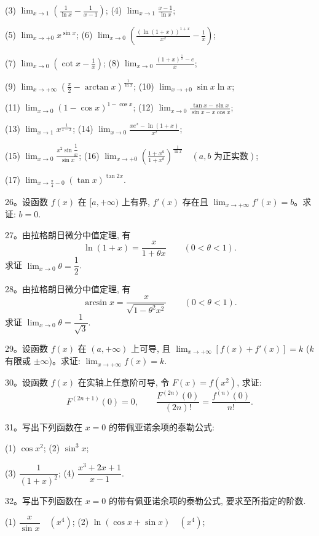 (3) $\displaystyle\lim_{x\to1}\left(\frac1{\ln x}-\frac1{x-1}\right)$;\qquad
(4) $\displaystyle\lim_{x\to1}\frac{x-1}{\ln x}$;

(5) $\displaystyle\lim_{x\to+0}x^{\sin x}$;\qquad
(6) $\displaystyle\lim_{x\to0}\left(\frac{(\ln(1+x))^{1+x}}{x^2}-\frac1x\right)$;

(7) $\displaystyle\lim_{x\to0}\left(\cot x-\frac1x\right)$;\qquad
(8) $\displaystyle\lim_{x\to0}\frac{(1+x)^{\frac1x}-e}{x}$;

(9) $\displaystyle\lim_{x\to+\infty}\left(\frac\pi2-\arctan x\right)^{\frac1{\ln x}}$;\qquad
(10) $\displaystyle\lim_{x\to+0}\sin x\ln x$;

(11) $\displaystyle\lim_{x\to0}(1-\cos x)^{1-\cos x}$;\qquad
(12) $\displaystyle\lim_{x\to0}\frac{\tan x-\sin x}{\sin x-x\cos x}$;

(13) $\displaystyle\lim_{x\to1}x^{\frac1{1-x}}$;\qquad
(14) $\displaystyle\lim_{x\to0}\frac{xe^x-\ln(1+x)}{x^2}$;

(15) $\displaystyle\lim_{x\to0}\frac{x^2\sin\dfrac1x}{\sin x}$;\qquad
(16) $\displaystyle\lim_{x\to+0}\left(\frac{1+x^a}{1+x^b}\right)^{\frac1{\ln x}}\quad (a,b\text{ 为正实数})$;

(17) $\displaystyle\lim_{x\to\frac\pi4-0}(\tan x)^{\tan 2x}$.

26。设函数 $f(x)$ 在 $[a,+\infty)$ 上有界, $f'(x)$ 存在且 $\lim_{x\to+\infty}f'(x)=b$。求证: $b=0$.

27。由拉格朗日微分中值定理, 有
\[
  \ln(1+x)=\frac{x}{1+\theta x}\qquad (0<\theta<1).
\]
求证 $\lim_{x\to0}\theta=\dfrac12$.

28。由拉格朗日微分中值定理, 有
\[
  \arcsin x=\frac{x}{\sqrt{1-\theta^2x^2}}\qquad (0<\theta<1).
\]
求证 $\lim_{x\to0}\theta=\dfrac1{\sqrt3}$.

29。设函数 $f(x)$ 在 $(a,+\infty)$ 上可导, 且 $\lim_{x\to+\infty}[f(x)+f'(x)]=k$ ($k$ 有限或 $\pm\infty$)。求证: $\lim_{x\to+\infty}f(x)=k$.

30。设函数 $f(x)$ 在实轴上任意阶可导, 令 $F(x)=f(x^2)$, 求证:
\[
  F^{(2n+1)}(0)=0,\qquad
  \frac{F^{(2n)}(0)}{(2n)!}=\frac{f^{(n)}(0)}{n!}.
\]

31。写出下列函数在 $x=0$ 的带佩亚诺余项的泰勒公式:

(1) $\cos x^2$;\qquad
(2) $\sin^3x$;

(3) $\dfrac1{(1+x)^2}$;\qquad
(4) $\dfrac{x^3+2x+1}{x-1}$.

32。写出下列函数在 $x=0$ 的带有佩亚诺余项的泰勒公式, 要求至所指定的阶数.

(1) $\dfrac{x}{\sin x}\quad (x^4)$;\qquad
(2) $\ln(\cos x+\sin x)\quad (x^4)$;

